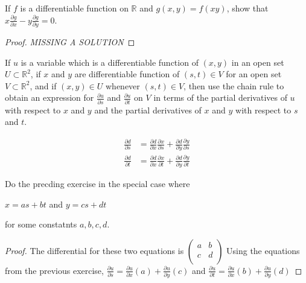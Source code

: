 \documentclass[12pt]{book}
\newcommand{\R}{\mathbb{R}}
\newenvironment{exercise}[2][Exercise]{\begin{trivlist}
\item[\hskip \labelsep {\bfseries #1}\hskip \labelsep {\bfseries #2.}]}{\end{trivlist}}
\begin{document}
\begin{exercise}{9.3.4}
	If $f$ is a differentiable function on $\R$ and $g(x, y) = f(x y)$, show  that $x \frac{\partial g}{\partial x} - y \frac{\partial g}{\partial y} = 0$.

	\begin{proof}
	\emph{MISSING A SOLUTION}
	\end{proof}
\end{exercise}




\begin{exercise}{9.3.6}
	If $u$ is a variable which is a differentiable function of $(x,y)$ in an open set $U \subset \R^2$, if $x$ and $y$ are differentiable function of $(s,t) \in V$ for an open set $V \subset \R^2$, and if $(x,y) \in U$ whenever $(s,t) \in V$, then use the chain rule  to  obtain an expression for $\frac{\partial u}{\partial s}$ and $\frac{\partial u}{\partial t}$ on $V$ in terms of the partial derivatives of $u$ with respect to $x$ and $y$ and the partial derivatives of $x$ and $y$ with respect to $s$ and $t$.

    \begin{align*}
    \frac{\partial d}{\partial s} &= \frac{\partial d}{\partial x} \frac{\partial x}{\partial s} + \frac{\partial d}{\partial y} \frac{\partial y}{\partial s} \\
    \frac{\partial d }{\partial t} &= \frac{\partial d}{\partial x} \frac{\partial x}{\partial t} + \frac{\partial d }{\partial y} \frac{\partial y}{\partial t} 
    \end{align*}
\end{exercise}


\begin{exercise}{9.3.7}
Do the precding exercise in the special case where\newline
\begin{center}
$x = as + bt$ and $y=cs+dt$ 
\end{center}
for some constatnts $a,b,c,d$.
\begin{proof}
The differential for these two equations is $\begin{pmatrix}
a & b \\
c & d\\
\end{pmatrix}$
Using the equations from the previous exercise, $\frac{\partial u}{\partial s} = \frac{\partial u}{\partial x}(a) + \frac{\partial u}{\partial y}(c)$ and $\frac{\partial u}{\partial t} = \frac{\partial u}{\partial x}(b) + \frac{\partial u}{\partial y}(d)$
\end{proof}
\end{exercise}
\end{document}
